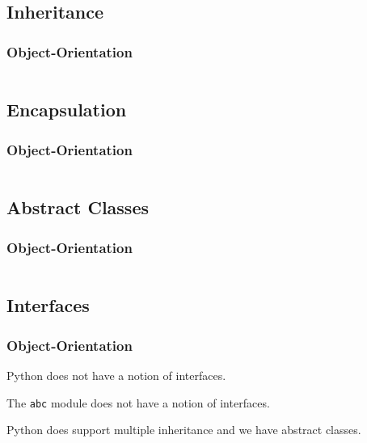 {\begin{frame}
    \inputminted[fontsize=\small]{python}{../src/objectconstructors.py}
\end{frame}

\subsection{Inheritance}
\begin{frame}
    \frametitle{Object-Orientation }
    \vspace{2mm}
    
    \inputminted[fontsize=\small]{python}{../src/objectinheritance.py}
\end{frame}

\subsection{Encapsulation}
\begin{frame}
    \frametitle{Object-Orientation }
    \vspace{2mm}
    
    \inputminted[fontsize=\small]{python}{../src/objectencapsulation.py}
\end{frame}

\subsection{Abstract Classes}
\begin{frame}
    \frametitle{Object-Orientation }
    \vspace{-1mm}
    
    \inputminted[fontsize=\footnotesize]{python}{../src/objectabs.py}
\end{frame}

\subsection{Interfaces}
\begin{frame}
    \frametitle{Object-Orientation }
    \pause
    \vspace{3mm}
    Python does not have a notion of interfaces.
    
    \pause
    \vspace{5mm}
    The \texttt{abc} module does not have a notion of interfaces.
    
    \pause
    \vspace{5mm}
    Python does support multiple inheritance and we have abstract classes.
    

\end{frame}}
